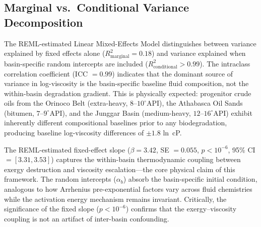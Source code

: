 \documentclass[review,12pt]{elsarticle}
\begin{document}
\begin{table}[ht!]
\centering
\caption{Parameter Sensitivity Analysis ($\pm 20\%$ Coefficient Perturbation)}
\label{tab:sensitivity}
\end{table}

\subsection{Marginal vs.\ Conditional Variance Decomposition}
The REML-estimated Linear Mixed-Effects Model distinguishes between variance explained by fixed effects alone ($R^2_{\text{marginal}} = 0.18$) and variance explained when basin-specific random intercepts are included ($R^2_{\text{conditional}} > 0.99$). The intraclass correlation coefficient (ICC $= 0.99$) indicates that the dominant source of variance in log-viscosity is the basin-specific baseline fluid composition, not the within-basin degradation gradient. This is physically expected: progenitor crude oils from the Orinoco Belt (extra-heavy, $8$--$10^{\circ}$API), the Athabasca Oil Sands (bitumen, $7$--$9^{\circ}$API), and the Junggar Basin (medium-heavy, $12$--$16^{\circ}$API) exhibit inherently different compositional baselines prior to any biodegradation, producing baseline log-viscosity differences of $\pm 1.8$ ln~cP.

The REML-estimated fixed-effect slope ($\beta = 3.42$, SE $= 0.055$, $p < 10^{-6}$, 95\% CI $= [3.31, 3.53]$) captures the within-basin thermodynamic coupling between exergy destruction and viscosity escalation---the core physical claim of this framework. The random intercepts ($\alpha_b$) absorb the basin-specific initial condition, analogous to how Arrhenius pre-exponential factors vary across fluid chemistries while the activation energy mechanism remains invariant. Critically, the significance of the fixed slope ($p < 10^{-6}$) confirms that the exergy--viscosity coupling is not an artifact of inter-basin confounding.
\end{document}
